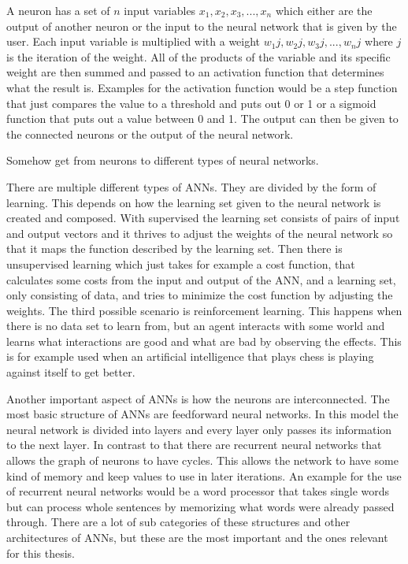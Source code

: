A neuron has a set of $n$ input variables $x_1, x_2, x_3, ..., x_n$ which either are the output of another neuron or the input to the neural network that is given by the user. Each input variable is multiplied with a weight $w_1j, w_2j, w_3j, ..., w_nj$ where $j$ is the iteration of the weight. All of the products of the variable and its specific weight are then summed and passed to an activation function that determines what the result is. Examples for the activation function would be a step function that just compares the value to a threshold and puts out 0 or 1 or a sigmoid function that puts out a value between 0 and 1. The output can then be given to the connected neurons or the output of the neural network.

Somehow get from neurons to different types of neural networks.

There are multiple different types of ANNs. They are divided by the form of learning. This depends on how the learning set given to the neural network is created and composed. With supervised the learning set consists of pairs of input and output vectors and it thrives to adjust the weights of the neural network so that it maps the function described by the learning set. Then there is unsupervised learning which just takes for example a cost function, that calculates some costs from the input and output of the ANN, and a learning set, only consisting of data, and tries to minimize the cost function by adjusting the weights. The third possible scenario is reinforcement learning. This happens when there is no data set to learn from, but an agent interacts with some world and learns what interactions are good and what are bad by observing the effects. This is for example used when an artificial intelligence that plays chess is playing against itself to get better.

Another important aspect of ANNs is how the neurons are interconnected. The most basic structure of ANNs are feedforward neural networks. In this model the neural network is divided into layers and every layer only passes its information to the next layer. In contrast to that there are recurrent neural networks that allows the graph of neurons to have cycles. This allows the network to have some kind of memory and keep values to use in later iterations. An example for the use of recurrent neural networks would be a word processor that takes single words but can process whole sentences by memorizing what words were already passed through. There are a lot of sub categories of these structures and other architectures of ANNs, but these are the most important and the ones relevant for this thesis.

